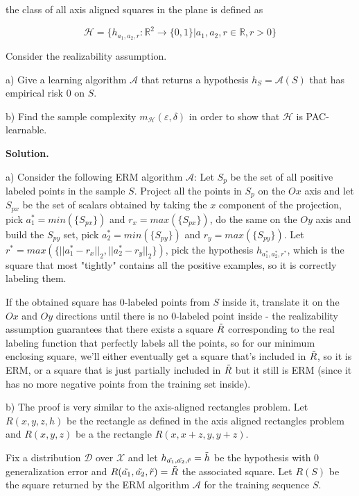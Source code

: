 \documentclass{article}
\newcommand{\<}{\langle}
\renewcommand{\>}{\rangle}
\theoremstyle{definition}
\begin{document}
the class of all axis aligned squares in the plane is defined as

$$\mathcal{H}=\{h_{a_1, a_2, r}:\mathbb{R}^2\to\{0,1\}|a_1, a_2, r\in \mathbb{R}, r>0\}$$

Consider the realizability assumption.

a) Give a learning algorithm $\mathcal{A}$ that returns a hypothesis $h_S=\mathcal{A}(S)$ that has empirical risk 0 on $S$.

b) Find the sample complexity $m_\mathcal{H}(\varepsilon, \delta)$ in order to show that $\mathcal{H}$ is PAC-learnable.

\textbf{Solution.}

a) Consider the following ERM algorithm $\mathcal{A}$: Let $S_p$ be the set of all positive labeled points in the sample $S$. Project all the points in $S_p$ on the $Ox$ axis and let $S_{px}$ be the set of scalars obtained by taking the $x$ component of the projection, pick $a_1^* = min(\{S_{px}\})$ and $r_x=max(\{S_{px}\})$, do the same on the $Oy$ axis and build the $S_{py}$ set, pick $a_2^*=min(\{S_{py}\})$ and $r_y=max(\{S_{py}\})$. Let $r^*=max(\{||a_1^*-r_x||_2, ||a_2^*-r_y||_2\})$, pick the hypothesis $h_{a_1^*, a_2^*, r^*}$, which is the square that most "tightly" contains all the positive examples, so it is correctly labeling them. 

If the obtained square has 0-labeled points from $S$ inside it, translate it on the $Ox$ and $Oy$ directions until there is no 0-labeled point inside - the realizability assumption guarantees that there exists a square $\Tilde{R}$ corresponding to the real labeling function that perfectly labels all the points, so for our minimum enclosing square, we'll either eventually get a square that's included in $\Tilde{R}$, so it is ERM, or a square that is just partially included in $\Tilde{R}$ but it still is ERM (since it has no more negative points from the training set inside). 

b) The proof is very similar to the axis-aligned rectangles problem. Let $R(x,y,z,h)$ be the rectangle as defined in the axis aligned rectangles problem and $R(x,y,z)$ be a the rectangle $R(x, x+z, y, y+z)$.

Fix a distribution $\mathcal{D}$ over $\mathcal{X}$ and let $h_{\Tilde{a_1}, \Tilde{a_2}, \Tilde{r}}=\Tilde{h}$ be the hypothesis with 0 generalization error and $R(\Tilde{a_1}, \Tilde{a_2}, \Tilde{r}) = \Tilde{R}$ the associated square. Let $R(S)$ be the square returned by the ERM algorithm $\mathcal{A}$ for the training sequence $S$.
\end{document}
